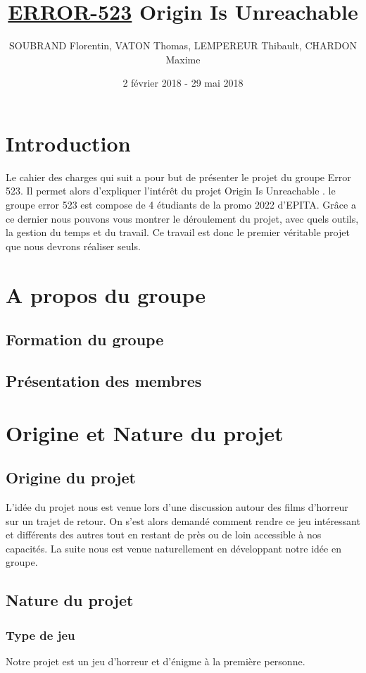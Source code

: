 \documentclass[12pt,a4paper]{article}
\title{\textbf { \huge{\underline{ERROR-523}} \bigbreak  \large{Origin Is Unreachable}}}
\author{SOUBRAND Florentin, VATON Thomas, LEMPEREUR Thibault, CHARDON Maxime}
\date {2 février 2018 - 29 mai 2018}
\begin{document}
\pagestyle{fancy}




\newpage
\thispagestyle{empty}
\tableofcontents

\newpage

\section{Introduction}
Le cahier des charges qui suit a pour but de présenter le projet du groupe Error 523. Il permet alors d'expliquer l'intérêt du projet Origin Is Unreachable . le groupe error 523 est compose de 4 étudiants de la promo 2022 d'EPITA. Grâce a ce dernier nous pouvons vous montrer le déroulement du projet, avec quels outils, la gestion du temps et du travail. Ce travail est donc le premier véritable projet que nous devrons réaliser seuls.

\newpage
\section {A propos du groupe}
\subsection{Formation du groupe}

\subsection{Présentation des membres}


\newpage
\section{Origine et Nature du projet}
\subsection{Origine du projet}
L'idée du projet nous est venue lors d'une discussion autour des films d'horreur sur un trajet de retour. On s'est alors demandé comment rendre ce jeu intéressant et différents des autres tout en restant de près ou de loin accessible à nos capacités. La suite nous est venue naturellement en développant notre idée en groupe. 

\newpage
\subsection{Nature du projet}
\subsubsection{Type de jeu}
Notre projet est un jeu d'horreur et d'énigme à la première personne.
\end{document}
